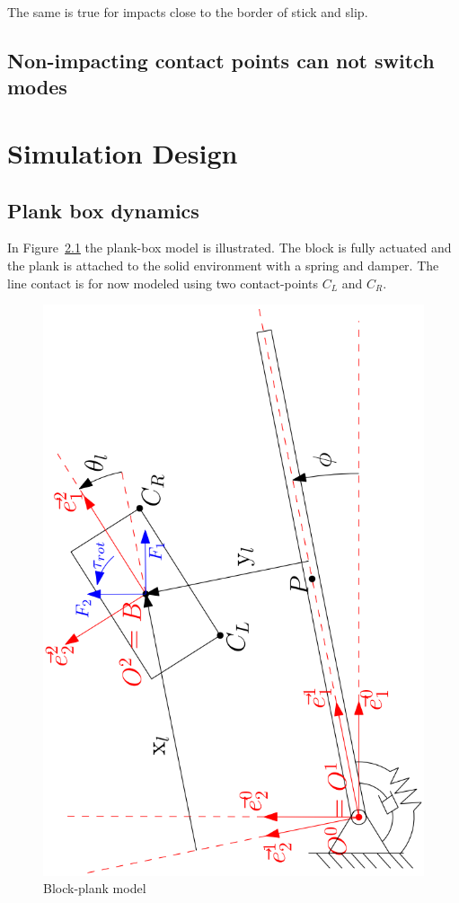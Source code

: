 \documentclass[../DC2017114Bouma.tex]{subfiles}
\begin{document}
The same is true for impacts close to the border of stick and slip.

\section{Non-impacting contact points can not switch modes}

\cleartooddpage
\chapter{Simulation Design}
\section{Plank box dynamics}
In Figure~\ref{fig:blockplank} the plank-box model is illustrated. The block is fully actuated and the plank is attached to the solid environment with a spring and damper. The line contact is for now modeled using two contact-points $C_L$ and $C_R$.

\begin{figure}[h]
\centering
\includegraphics[width=.6\textwidth,angle=-90]{blockplankmodel.PNG}\caption{Block-plank model}\label{fig:blockplank}
\end{figure}
\end{document}
